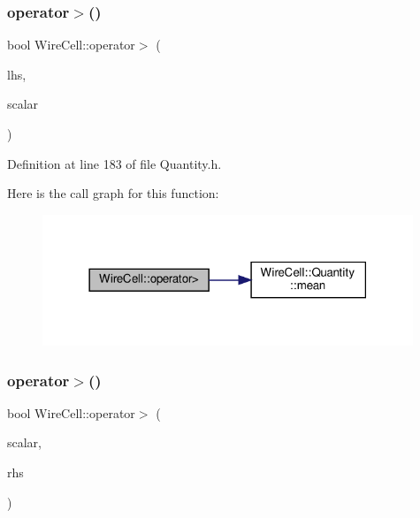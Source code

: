 \subsubsection{\texorpdfstring{operator$>$()}{operator>()}\hspace{0.1cm}{\footnotesize\ttfamily [1/2]}}
{\footnotesize\ttfamily bool Wire\+Cell\+::operator$>$ (\begin{DoxyParamCaption}\item[{const \hyperlink{class_wire_cell_1_1_quantity}{Wire\+Cell\+::\+Quantity} \&}]{lhs,  }\item[{const double \&}]{scalar }\end{DoxyParamCaption})\hspace{0.3cm}{\ttfamily [inline]}}



Definition at line 183 of file Quantity.\+h.

Here is the call graph for this function\+:
\nopagebreak
\begin{figure}[H]
\begin{center}
\leavevmode
\includegraphics[width=314pt]{namespace_wire_cell_a998a57c55b36e2d63d5cb6c726153215_cgraph}
\end{center}
\end{figure}
\mbox{\label{namespace_wire_cell_a58f770141d858d0d03024cfafadc2f6a}} 
\subsubsection{\texorpdfstring{operator$>$()}{operator>()}\hspace{0.1cm}{\footnotesize\ttfamily [2/2]}}
{\footnotesize\ttfamily bool Wire\+Cell\+::operator$>$ (\begin{DoxyParamCaption}\item[{const double \&}]{scalar,  }\item[{const \hyperlink{class_wire_cell_1_1_quantity}{Wire\+Cell\+::\+Quantity} \&}]{rhs }\end{DoxyParamCaption})\hspace{0.3cm}{\ttfamily [inline]}}



